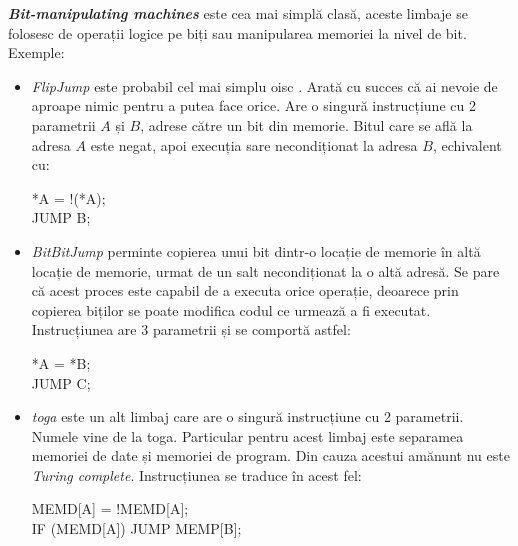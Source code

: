 \documentclass[../main.tex]{subfiles}
\begin{document}
\emph{\textbf{Bit-manipulating machines}} este cea mai simplă clasă, aceste limbaje se folosesc de operații logice pe biți
sau manipularea memoriei la nivel de bit. Exemple:
\begin{itemize}
    \item \emph{FlipJump} \cite{flipjump} este probabil cel mai simplu \acrshort{oisc} \cite{oisc}. Arată cu succes că
    ai nevoie de aproape nimic pentru a putea face orice. Are o singură instrucțiune cu 2 parametrii $A$ și $B$, adrese către un
    bit din memorie. Bitul care se află la adresa $A$ este negat, apoi execuția sare necondiționat la adresa $B$, echivalent cu:
    \begin{center}\ttfamily
        *A = !(*A);\\
        JUMP B;
    \end{center}
    \item \emph{BitBitJump} \cite{bitbitjump} perminte copierea unui bit dintr-o locație de memorie în altă locație de memorie,
    urmat de un salt necondiționat la o altă adresă. Se pare că acest proces este capabil de a executa orice operație, deoarece
    prin copierea biților se poate modifica codul ce urmează a fi executat. Instrucțiunea are 3 parametrii și se comportă astfel:
    \begin{center}\ttfamily
        *A = *B;\\
        JUMP C;
    \end{center}
    \item \emph{\acrshort{toga}} \cite{toga} este un alt limbaj care are o singură instrucțiune cu 2 parametrii. Numele vine de la \acrlong{toga}.
    Particular pentru acest limbaj este separamea memoriei de date și memoriei de program. Din cauza acestui amănunt nu este
    \emph{Turing complete}. Instrucțiunea se traduce în acest fel:
    \begin{center}\ttfamily
        MEMD[A] = !MEMD[A];\\
        IF (MEMD[A]) JUMP MEMP[B];
    \end{center}
\end{itemize}
\end{document}
